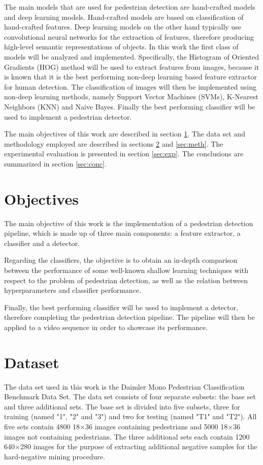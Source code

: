 \documentclass[journal,twocolumn]{IEEEtran}
\begin{document}
The main models that are used for pedestrian detection are
hand-crafted models and deep learning models. Hand-crafted
models are based on classification of hand-crafted features. Deep learning models on the other hand typically use
convolutional neural networks for the extraction of features,
therefore producing high-level semantic representations of
objects.
In this work the first class of models will be analyzed
and implemented. Specifically, the Histogram of Oriented
Gradients (HOG) method will be used to extract features from
images, because it is known\cite{2} that it is the best performing non-deep learning based feature extractor for human detection. The classification of images will then be implemented
using non-deep learning methods, namely Support Vector
Machines (SVMs), K-Nearest Neighbors (KNN) and Naive Bayes. Finally the best performing classifier will be used
to implement a pedestrian detector.

The main objectives of this work are described in section
\ref{sec:obj}. The data set and methodology employed are described in
sections \ref{sec:data} and \ref{sec:meth}. The experimental evaluation is presented
in section \ref{sec:exp}. The conclusions are summarized in section \ref{sec:conc}.

\section{Objectives}
\label{sec:obj}
The main objective of this work is the implementation of
a pedestrian detection pipeline, which is made up
of three main components: a feature extractor, a classifier and a
detector.

Regarding the classifiers, the objective is to obtain an in-depth comparison between the performance of some well-known shallow learning techniques with respect to the problem of pedestrian detection, as well as the relation between hyperparameters and classifier performance.

Finally, the best performing classifier will be used to implement a detector, therefore completing the pedestrian detection pipeline. The pipeline will then be applied to a video sequence in order to showcase its performance.

\section{Dataset}
\label{sec:data}

The data set used in this work is the Daimler Mono Pedestrian Classification Benchmark Data Set. The data set consists of four separate subsets: the base set and three additional sets. The base set is divided into five subsets, three for training (named "1", "2" and "3") and two for testing (named "T1" and "T2"). All five sets contain 4800 18$\times$36 images containing pedestrians and 5000 18$\times$36 images not containing pedestrians. The three additional sets each contain 1200 640$\times$280 images for the purpose of extracting additional negative samples for the hard-negative mining procedure.
\end{document}
